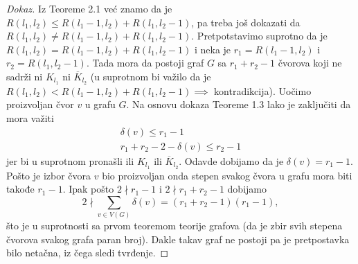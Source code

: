 \documentclass{article}
\theoremstyle{definition}
\newcommand{\dokaz}[1]{\begin{proof}[Dokaz]#1\end{proof}}
\begin{document}
	\dokaz{
		Iz Teoreme 2.1 već znamo da je $R(l_1,l_2) \leq R(l_1-1, l_2) + R(l_1, l_2-1)$, pa treba još dokazati da
		$R(l_1,l_2) \neq R(l_1-1, l_2) + R(l_1, l_2-1)$. \newline
		Pretpotstavimo suprotno da je $R(l_1,l_2) = R(l_1-1, l_2) + R(l_1, l_2-1)$ i neka je $r_1 = R(l_1 - 1, l_2)$ i $r_2 = R(l_1, l_2 - 1)$.
		Tada mora da postoji graf $G$ sa $r_1 + r_2 - 1$ čvorova koji ne sadrži ni $K_{l_1}$ ni $\overline K_{l_2}$ (u suprotnom bi važilo da je
		$R(l_1,l_2) < R(l_1-1, l_2) + R(l_1, l_2-1) \implies$ kontradikcija). Uočimo proizvoljan čvor $v$ u grafu $G$. Na osnovu dokaza Teoreme 1.3 lako
		je zaključiti da mora važiti 
		\begin{gather}
			\delta(v) \leq r_1 - 1 \\
			r_1 + r_2 - 2 - \delta(v) \leq r_2 - 1
		\end{gather} 
		jer bi u suprotnom pronašli ili  $K_{l_1}$ ili  $\overline K_{l_2}$. Odavde dobijamo da je $\delta(v) = r_1 - 1$. Pošto je izbor čvora $v$ bio 
		proizvoljan onda stepen svakog čvora u grafu mora biti takođe $r_1 - 1$. Ipak pošto $2 \nmid r_1 - 1$ i $2 \nmid r_1 + r_2 - 1$ dobijamo
		$$2 \nmid \sum_{v \in V(G)}{\delta(v)} = (r_1 + r_2 - 1)(r_1 - 1),$$ što je u suprotnosti sa prvom teoremom teorije grafova (da je zbir svih 				stepena čvorova svakog grafa paran broj). Dakle takav graf ne postoji pa je pretpostavka bilo netačna, iz čega sledi tvrđenje.
	}

	
\end{document}
